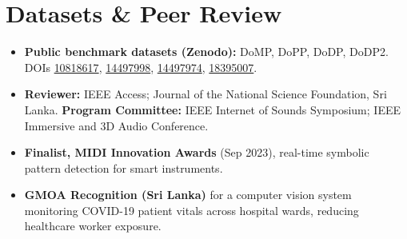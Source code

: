 \documentclass[11pt]{article}
\begin{document}
\section*{Datasets \& Peer Review}
\begin{itemize}[leftmargin=1.2em, itemsep=-0.3em, topsep=0em]
    \item \textbf{Public benchmark datasets (Zenodo):} DoMP, DoPP, DoDP, DoDP2. DOIs \href{https://doi.org/10.5281/zenodo.10818617}{10818617}, \href{https://doi.org/10.5281/zenodo.14497998}{14497998}, \href{https://doi.org/10.5281/zenodo.14497974}{14497974}, \href{https://doi.org/10.5281/zenodo.18395007}{18395007}.
    \item \textbf{Reviewer:} IEEE Access; Journal of the National Science Foundation, Sri Lanka. \textbf{Program Committee:} IEEE Internet of Sounds Symposium; IEEE Immersive and 3D Audio Conference.
    \item \textbf{Finalist, MIDI Innovation Awards} (Sep 2023), real-time symbolic pattern detection for smart instruments. 
    \item \textbf{GMOA Recognition (Sri Lanka)} for a computer vision system monitoring COVID-19 patient vitals across hospital wards, reducing healthcare worker exposure.
\end{itemize}
\end{document}

